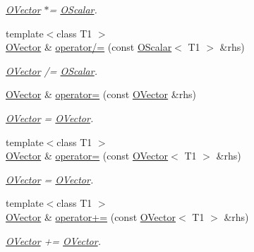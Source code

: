 \begin{DoxyCompactItemize}
\begin{DoxyCompactList}\small\item\em \mbox{\hyperlink{classENSEM_1_1OVector}{O\+Vector}} $\ast$= \mbox{\hyperlink{classENSEM_1_1OScalar}{O\+Scalar}}. \end{DoxyCompactList}\item 
{\footnotesize template$<$class T1 $>$ }\\\mbox{\hyperlink{classENSEM_1_1OVector}{O\+Vector}} \& \mbox{\hyperlink{classENSEM_1_1OVector_aa26be39a0620d0cdc1685bc2f1cc31a5}{operator/=}} (const \mbox{\hyperlink{classENSEM_1_1OScalar}{O\+Scalar}}$<$ T1 $>$ \&rhs)
\begin{DoxyCompactList}\small\item\em \mbox{\hyperlink{classENSEM_1_1OVector}{O\+Vector}} /= \mbox{\hyperlink{classENSEM_1_1OScalar}{O\+Scalar}}. \end{DoxyCompactList}\item 
\mbox{\hyperlink{classENSEM_1_1OVector}{O\+Vector}} \& \mbox{\hyperlink{classENSEM_1_1OVector_af1d768a4392ac2caf7d93faef7b39ed2}{operator=}} (const \mbox{\hyperlink{classENSEM_1_1OVector}{O\+Vector}} \&rhs)
\begin{DoxyCompactList}\small\item\em \mbox{\hyperlink{classENSEM_1_1OVector}{O\+Vector}} = \mbox{\hyperlink{classENSEM_1_1OVector}{O\+Vector}}. \end{DoxyCompactList}\item 
{\footnotesize template$<$class T1 $>$ }\\\mbox{\hyperlink{classENSEM_1_1OVector}{O\+Vector}} \& \mbox{\hyperlink{classENSEM_1_1OVector_a7d5f2f5a6c1dc742f53cc4dabc86722e}{operator=}} (const \mbox{\hyperlink{classENSEM_1_1OVector}{O\+Vector}}$<$ T1 $>$ \&rhs)
\begin{DoxyCompactList}\small\item\em \mbox{\hyperlink{classENSEM_1_1OVector}{O\+Vector}} = \mbox{\hyperlink{classENSEM_1_1OVector}{O\+Vector}}. \end{DoxyCompactList}\item 
{\footnotesize template$<$class T1 $>$ }\\\mbox{\hyperlink{classENSEM_1_1OVector}{O\+Vector}} \& \mbox{\hyperlink{classENSEM_1_1OVector_a5ecd1c4c6a2e7d9a6a3e5189b3a22ba5}{operator+=}} (const \mbox{\hyperlink{classENSEM_1_1OVector}{O\+Vector}}$<$ T1 $>$ \&rhs)
\begin{DoxyCompactList}\small\item\em \mbox{\hyperlink{classENSEM_1_1OVector}{O\+Vector}} += \mbox{\hyperlink{classENSEM_1_1OVector}{O\+Vector}}. \end{DoxyCompactList}\item 

\end{DoxyCompactItemize}
